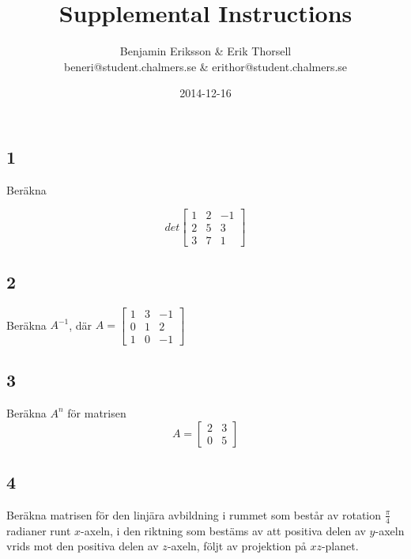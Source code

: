\documentclass{article}
\title{Supplemental Instructions}
\author{Benjamin Eriksson \& Erik Thorsell \\ 
		\small{beneri@student.chalmers.se} \&
		\small{erithor@student.chalmers.se}
}
\date{
     2014-12-16 
 }
\begin{document}
\maketitle

\subsection*{1}
Beräkna 

$$
det
\begin{bmatrix}
 1 & 2 & -1 \\
 2 & 5 & 3 \\
 3 & 7 & 1
\end{bmatrix}
$$

\subsection*{2}
Beräkna $A^{-1}$, där 
$
A = 
\begin{bmatrix}
1 & 3 & -1 \\
0 & 1 & 2 \\
1 & 0 & -1
\end{bmatrix}
$

\subsection*{3}
Beräkna $A^n$ för matrisen
$$
A = 
\begin{bmatrix}
 2 & 3 \\
 0 & 5 
\end{bmatrix}
$$

\subsection*{4}
Beräkna matrisen för den linjära avbildning i rummet som består av rotation 
$\frac{\pi}{4}$ radianer runt $x$-axeln, i den riktning som bestäms av att 
positiva delen av $y$-axeln vrids mot den positiva delen av $z$-axeln, följt 
av projektion på $xz$-planet.
\end{document}
